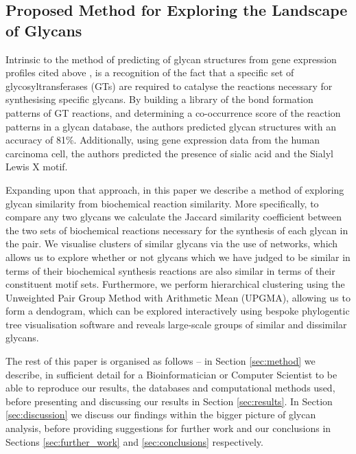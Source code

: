 \documentclass[12pt,a4paper]{article}
\begin{document}
\subsection{Proposed Method for Exploring the Landscape of Glycans}
\label{sec:proposed_method}
Intrinsic to the method of predicting of glycan structures from gene expression profiles cited above \citep{doi:10.1093/bioinformatics/bti666}, is a recognition of the fact that a specific set of glycosyltransferases (GTs) are required to catalyse the reactions necessary for synthesising specific glycans. By building a library of the bond formation patterns of GT reactions, and determining a co-occurrence score of the reaction patterns in a glycan database, the authors predicted glycan structures with an accuracy of 81\%. Additionally, using gene expression data from the human carcinoma cell, the authors predicted the presence of sialic acid and the Sialyl Lewis X motif.

Expanding upon that approach, in this paper we describe a method of exploring glycan similarity from biochemical reaction similarity. More specifically, to compare any two glycans we calculate the Jaccard similarity coefficient between the two sets of biochemical reactions necessary for the synthesis of each glycan in the pair. We visualise clusters of similar glycans via the use of networks, which allows us to explore whether or not glycans which we have judged to be similar in terms of their biochemical synthesis reactions are also similar in terms of their constituent motif sets. Furthermore, we perform hierarchical clustering using the Unweighted Pair Group Method with Arithmetic Mean (UPGMA), allowing us to form a dendogram, which can be explored interactively using bespoke phylogentic tree visualisation software and reveals large-scale groups of similar and dissimilar glycans.

The rest of this paper is organised as follows -- in Section \ref{sec:method} we describe, in sufficient detail for a Bioinformatician or Computer Scientist to be able to reproduce our results, the databases and computational methods used, before presenting and discussing our results in Section \ref{sec:results}. In Section \ref{sec:discussion} we discuss our findings within the bigger picture of glycan analysis, before providing suggestions for further work and our conclusions in Sections \ref{sec:further_work} and \ref{sec:conclusions} respectively.
\end{document}
